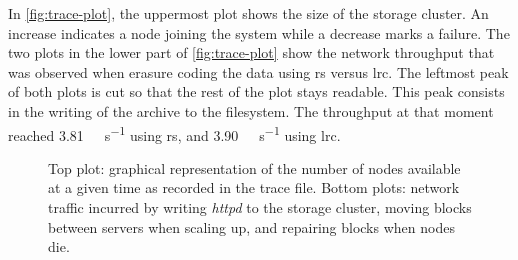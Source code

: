 In \autoref{fig:trace-plot}, the uppermost plot shows the size of the storage cluster.
An increase indicates a node joining the system while a decrease marks a failure.
The two plots in the lower part of \autoref{fig:trace-plot} show the network throughput that was observed when erasure coding the data using \ac{rs} versus \ac{lrc}.
The leftmost peak of both plots is cut so that the rest of the plot stays 
readable.
This peak consists in the writing of the archive to the filesystem.
The throughput at that moment reached \SI{3.81}{\mega\byte\per\second} using 
\ac{rs}, and \SI{3.90}{\mega\byte\per\second} using \ac{lrc}.

\begin{figure*}
    \centering
    
    \caption{Top plot: graphical representation of the number of nodes available at a given time as recorded in the trace file. Bottom plots: network traffic incurred by writing \textit{httpd} to the storage cluster, moving blocks between servers when scaling up, and repairing blocks when nodes die.}
    \label{fig:trace-plot}
\end{figure*}